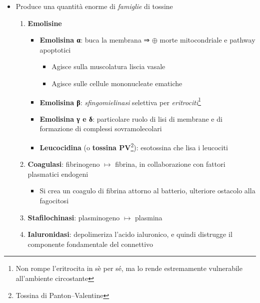 \documentclass[italian,]{article}
\providecommand{\tightlist}{%
  \setlength{\itemsep}{0pt}\setlength{\parskip}{0pt}}
\newcommand{\marginnote}[1]{\marginpar{\footnotesize← \emph{#1}}}
\newcommand{\att}[0]{ $\oplus$ }                                        %
\begin{document}
\begin{itemize}
\tightlist
\item
  Produce una quantità enorme di \emph{famiglie} di tossine

  \begin{enumerate}
  \def\labelenumi{\arabic{enumi}.}
  \tightlist
  \item
    \textbf{Emolisine}

    \begin{itemize}
    \tightlist
    \item
      \textbf{Emolisina α}: buca la membrana ⇒ \att morte mitocondriale
      e pathway apoptotici

      \begin{itemize}
      \tightlist
      \item
        Agisce sulla muscolatura liscia vasale
      \item
        Agisce sulle cellule mononucleate ematiche
      \end{itemize}
    \item
      \textbf{Emolisina β}: \emph{sfingomielinasi} selettiva per
      \emph{eritrociti}\footnote{Non rompe l'eritrocita in sè per sé, ma
        lo rende estremamente vulnerabile all'ambiente circostante}
    \item
      \textbf{Emolisina γ e δ}: particolare ruolo di lisi di membrane e
      di formazione di complessi sovramolecolari
    \item
      \textbf{Leucocidina} (o \textbf{tossina PV}\footnote{Tossina di
        Panton--Valentine}): esotossina che lisa i leucociti
    \end{itemize}
  \item
    \textbf{Coagulasi}: fibrinogeno \(\mapsto\) fibrina, in
    collaborazione con fattori plasmatici endogeni
    \marginnote{Tipica dello \emph{S. auris}}

    \begin{itemize}
    \tightlist
    \item
      Si crea un coagulo di fibrina attorno al batterio, ulteriore
      ostacolo alla fagocitosi
    \end{itemize}
  \item
    \textbf{Stafilochinasi}: plasminogeno \(\mapsto\) plasmina
  \item
    \textbf{Ialuronidasi}: depolimeriza l'acido ialuronico, e quindi
    distrugge il componente fondamentale del connettivo


\end{enumerate}
\end{itemize}
\end{document}
